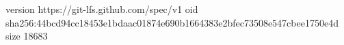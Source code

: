 version https://git-lfs.github.com/spec/v1
oid sha256:44bcd94cc18453e1bdaac01874e690b1664383e2bfec73508e547cbee1750e4d
size 18683
